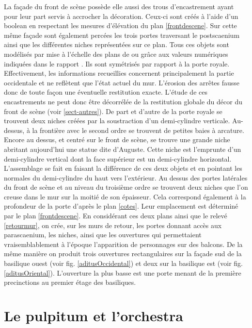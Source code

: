 La façade du front de scène possède elle aussi des trous d'encastrement ayant pour leur part servis à accrocher la décoration. Ceux-ci sont créés à l'aide d'un \gls{boolean} en respectant les mesures d'élévation du plan \ref{frontdescene}. Sur cette même façade sont également percées les trois portes traversant le \gls{postscaenium} ainsi que les différentes niches représentées sur ce plan. Tous ces objets sont modélisés par mise à l'échelle des plans de \cite{orangePl} ou grâce aux valeurs numériques indiquées dans le rapport \cite[Chap. II]{orangeTxt}. Ils sont symétrisés par rapport à la porte royale. Effectivement, les informations recueillies concernent principalement la partie occidentale et ne reflètent que l'état actuel du mur. L'érosion des arrêtes fausse donc de toute façon une éventuelle restitution exacte. L'étude de ces encastrements ne peut donc être décorrélée de la restitution globale du décor du front de scène (voir \ref{sect-autres}). De part et d'autre de la porte royale se trouvent deux niches créées par la soustraction d'un demi-cylindre verticale. Au-dessus, à la frontière avec le second ordre se trouvent de petites baies à arcature. Encore au dessus, et centré sur le front de scène, se trouve une grande niche abritant aujourd'hui une statue dite d'Auguste. Cette niche est l'emprunte d'un demi-cylindre vertical dont la face supérieur est un demi-cylindre horizontal. L'assemblage se fait en faisant la différence de ces deux objets et en pointant les normales du demi-cylindre du haut vers l'extérieur. Au dessus des portes latérales du front de scène et au niveau du troisième ordre se trouvent deux niches que l'on creuse dans le mur sur la moitié de son épaisseur. Cela correspond également à la profondeur de la porte d'après le plan \ref{cotes}. Leur emplacement est déterminé par le plan \ref{frontdescene}. En considérant ces deux plans ainsi que le relevé \ref{retourmur}, on crée, sur les murs de retour, les portes donnant accès aux \gls{parascaenium}, les niches, ainsi que les ouvertures qui permettaient vraisemblablement à l'époque l'apparition de personnages sur des balcons. De la même manière on produit trois ouvertures rectangulaires sur la façade sud de la \gls{basilique} ouest (voir fig. \ref{aditusOccidental}) et deux sur la \gls{basilique} est (voir fig. \ref{aditusOriental}). L'ouverture la plus basse est une porte menant de la première \glspl{precinction} au premier étage des \glspl{basilique}.


\section{Le \gls{pulpitum} et l'\gls{orchestra}} 

